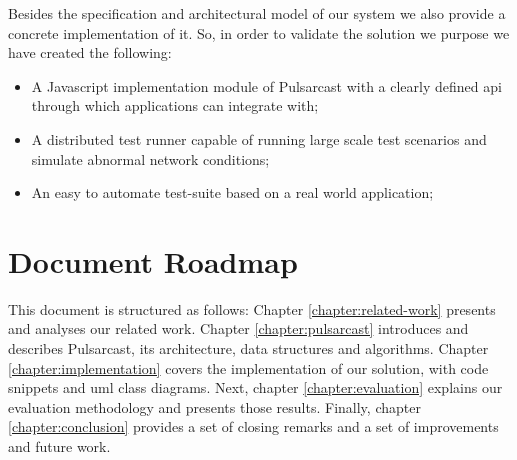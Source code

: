 Besides the specification and architectural model of our system we also provide
a concrete implementation of it. So, in order to validate the solution we
purpose we have created the following:

\begin{itemize}
  \item
    A Javascript implementation module of Pulsarcast with a clearly defined \acrshort{api} through which applications can integrate with;
  \item
    A distributed test runner capable of running large scale test scenarios and simulate abnormal network conditions;
  \item
    An easy to automate test-suite based on a real world application;
\end{itemize}

\section{Document Roadmap}

This document is structured as follows: Chapter \ref{chapter:related-work}
presents and analyses our related work. Chapter \ref{chapter:pulsarcast}
introduces and describes Pulsarcast, its architecture, data structures and
algorithms. Chapter \ref{chapter:implementation} covers the implementation of
our solution, with code snippets and \acrshort{uml} class diagrams. Next,
chapter \ref{chapter:evaluation} explains our evaluation methodology and
presents those results. Finally, chapter \ref{chapter:conclusion} provides a
set of closing remarks and a set of improvements and future work.

